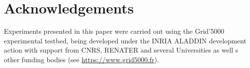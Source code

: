 \documentclass[10pt, conference, compsocconf]{sty/IEEEtran}
\begin{document}
\section*{Acknowledgements}
Experiments presented in this paper were carried out using the Grid'5000
experimental testbed, being developed under the INRIA ALADDIN development
action with support from CNRS, RENATER and several Universities as well
s other funding bodies (see \url{https://www.grid5000.fr}).


\balance

\end{document}
